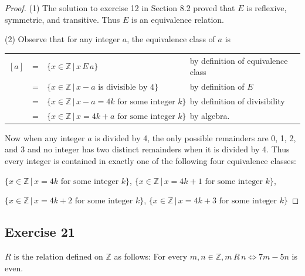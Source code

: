 \documentclass[14pt]{extarticle}
\newcommand{\Z}{\mathbb{Z}}
\newcommand{\cy}{\color{cyan}}
\begin{document}
\begin{proof}
        (1) The solution to exercise 12 in Section 8.2 proved that \(E\) is reflexive, symmetric, and transitive.
        Thus \(E\) is an equivalence relation.

        (2) Observe that for any integer \(a\), the equivalence class of \(a\) is

        \begin{tabular}{rcll}
                \([a]\) & = & \(\{x \in \Z \, | \, x \,E\, a\}\)                            & {\cy by definition of equivalence class} \\
                        & = & \(\{x \in \Z \,|\, x - a \text{ is divisible by } 4\}\)       & {\cy by definition of \(E\)}             \\
                        & = & \(\{x \in \Z \,|\, x - a = 4k \text{ for some integer } k\}\) & {\cy by definition of divisibility}      \\
                        & = & \(\{x \in \Z \,|\, x = 4k + a \text{ for some integer } k\}\) & {\cy by algebra.}
        \end{tabular}

        Now when any integer \(a\) is divided by 4, the only possible remainders are 0, 1, 2, and 3 and no integer has
        two distinct remainders when it is divided by 4. Thus every integer is contained in exactly one of the following four
        equivalence classes:

        \(\{x \in \Z \,|\, x = 4k \text{ for some integer } k\}\),
        \(\{x \in \Z \,|\, x = 4k + 1 \text{ for some integer } k\}\),

        \(\{x \in \Z \,|\, x = 4k + 2 \text{ for some integer } k\}\),
        \(\{x \in \Z \,|\, x = 4k + 3 \text{ for some integer } k\}\)
\end{proof}

\subsection{Exercise 21}
\(R\) is the relation defined on \(\Z\) as follows: For every \(m, n \in \Z, m \,R\, n \iff 7m - 5n\) is even.
\end{document}
